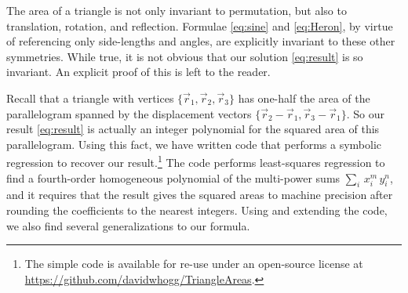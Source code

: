 \documentclass[10pt]{article}
\begin{document}
The area of a triangle is not only invariant to permutation, but also to translation, rotation, and reflection.
Formulae \eqref{eq:sine} and \eqref{eq:Heron}, by virtue of referencing only side-lengths and angles, are explicitly invariant to these other symmetries.
While true, it is not obvious that our solution \eqref{eq:result} is so invariant.
An explicit proof of this is left to the reader.

Recall that a triangle with vertices $\{ \vec{r}_1, \vec{r}_2, \vec{r}_3 \}$ has one-half the area of the parallelogram spanned by the displacement vectors $\{ \vec{r}_2 - \vec{r}_1, \vec{r}_3 - \vec{r}_1 \}$.
So our result \eqref{eq:result} is actually an integer polynomial for the squared area of this parallelogram.
Using this fact, we have written code that performs a symbolic regression to recover our result.\footnote{
    The simple code is available for re-use under an open-source license at \url{https://github.com/davidwhogg/TriangleAreas}.} 
The code performs least-squares regression to find a fourth-order homogeneous polynomial of the multi-power sums $\sum_i \, x_i^m \, y_i^n$, and it requires that the result gives the squared areas to machine precision after rounding the coefficients to the nearest integers.
Using and extending the code, we also find several generalizations to our formula.


\end{document}
